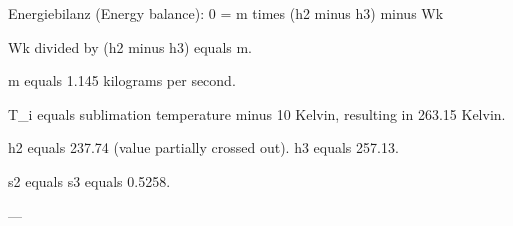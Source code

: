 Energiebilanz (Energy balance):  
0 = m times (h2 minus h3) minus Wk  

Wk divided by (h2 minus h3) equals m.  

m equals 1.145 kilograms per second.  

T_i equals sublimation temperature minus 10 Kelvin, resulting in 263.15 Kelvin.  

h2 equals 237.74 (value partially crossed out).  
h3 equals 257.13.  

s2 equals s3 equals 0.5258.  

---